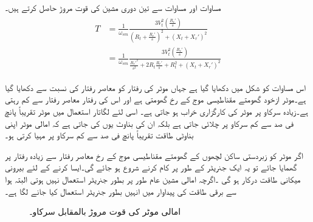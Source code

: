 مساوات   اور مساوات  سے  تین دوری مشین کی قوت مروڑ حاصل کرتے ہیں۔
\begin{gather}
\begin{aligned}\label{مساوات_امالی_تین_دور_مروڑ_الف}
T&=\frac{1}{\omega_{sm}} \frac{3 V_t^2 \left(\frac{R_r'}{s} \right)}{\left(R_t+\frac{R_r'}{s} \right)^2+\left(X_t+X_r' \right)^2}\\
&=\frac{1}{\omega_{sm}} \frac{3 V_t^2 \left(\frac{R_r'}{s} \right)}{\frac{R_r'^2}{s^2}+2 R_t \frac{R_r'}{s}+R_t^2+\left(X_t+X_r' \right)^2}
\end{aligned}
\end{gather}

اس مساوات کو شکل   میں دکھایا گیا ہے جہاں موٹر کی رفتار کو معاصر رفتار کی نسبت سے دکھایا گیا ہے۔موٹر ازخود گھومتے مقناطیسی موج کے رخ گھومتی ہے اور اس کی رفتار معاصر رفتار سے  کم رہتی ہے۔زیادہ سرکاو پر موٹر کی کارگزاری  خراب ہو جاتی ہے۔ اسی لئے  لگاتار استعمال میں موٹر  تقریباً پانچ فی صد سے کم سرکاو پر چلائی جاتی ہے بلکہ ان کی بناوٹ یوں کی جاتی ہے کہ امالی موٹر اپنی بناوٹی طاقت تقریباً پانچ فی صد سے کم سرکاو پر مہیا کرتی ہو۔ 

اگر موٹر کو زبردستی ساکن لچھوں کے گھومتے مقناطیسی موج کے رخ معاصر رفتار سے زیادہ رفتار پر گھمایا جائے تو یہ ایک جنریٹر کے طور پر کام کرنے شروع ہو جائے گی۔ایسا کرنے کے لئے بیرونی میکانی طاقت درکار ہو گی ۔اگرچہ امالی مشین عام طور پر بطور جنریٹر استعمال نہیں ہوتی البتہ ہوا سے برقی طاقت کی پیداوار میں انہیں بطور جنریٹر  استعمال کیا جانے لگا ہے۔
\begin{figure}
\centering
\caption{امالی موٹر کی قوت مروڑ بالمقابل سرکاو۔}
\label{شکل_امالی_مروڑ_بالمقابل_رفتار}
\end{figure}

